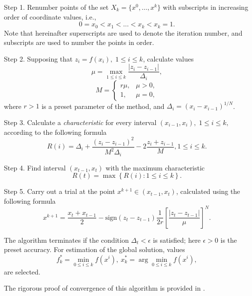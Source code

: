 \documentclass[sensors,article,submit,moreauthors,pdftex]{Definitions/mdpi}
\begin{document}
Step 1. Renumber points of the set $X_k=\{x^0,\dots,x^k\} $ with subscripts in increasing order of coordinate values, i.e.,
\[
0=x_0<x_1<\dots <x_k<x_{k}=1.
\]
Note that hereinafter superscripts are used to denote the iteration number, and subscripts are used to number the points in order.

Step 2. Supposing that  $z_i=f(x_i), \; 1\leq i \leq k$, calculate values 
\begin{equation}\label{mu}
\mu = \max_{1\leq i \leq k}\frac{\left|z_i-z_{i-1}\right|}{\Delta_i},
\end{equation}
\[
M = \left\{
   \begin{array}{lr}
     r\mu, & \mu > 0,\\
     1, & \mu = 0,
   \end{array}
\right.
 \]
where $r>1$ is a preset parameter of the method, and $\Delta_i=\left(x_i-x_{i-1}\right)^{1/N}$.

Step 3. Calculate a \textit{characteristic} for every interval $(x_{i-1}, x_i), \; 1\leq i \leq k,$   according to the following formula
\begin{equation}\label{R}
R(i)=\Delta_i+\frac{(z_i-z_{i-1})^2}{M^2\Delta_i}-2\frac{z_i+z_{i-1}}{M},1 \leq i \leq k.
\end{equation}

Step 4. Find interval $(x_{t-1},x_t)$ with the maximum characteristic
\begin{equation}\label{MaxR}
R(t)=\max{\left\{R(i): 1 \leq i \leq k \right\}}.
\end{equation}

Step 5. Carry out a trial at the point $x^{k+1}\in(x_{t-1},x_t)$, calculated using the following formula
\begin{equation}\label{NewX}
x^{k+1} = \frac{x_t+x_{t-1}}{2} - \mathrm{sign}(z_t-z_{t-1})\frac{1}{2r}\left[\frac{\left|z_t-z_{t-1}\right|}{\mu}\right]^N.
\end{equation}

The algorithm terminates if the condition $\Delta_t<\epsilon$ is satisfied; here $\epsilon>0$ is the preset accuracy. For estimation of the global solution, values
\[
f_k^\ast=\min_{0\leq i \leq k}f(x^i), \ x_k^\ast=\arg \min_{0\leq i \leq k}f(x^i),
\]
are selected.

The rigorous proof of convergence of this algorithm is provided in \cite{Strongin2000}. 
\end{document}
